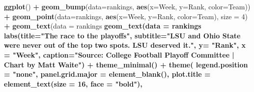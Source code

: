 \documentclass[
]{book}
\newenvironment{Shaded}{\begin{snugshade}}{\end{snugshade}}
\newcommand{\DataTypeTok}[1]{\textcolor[rgb]{0.13,0.29,0.53}{#1}}
\newcommand{\DecValTok}[1]{\textcolor[rgb]{0.00,0.00,0.81}{#1}}
\newcommand{\FloatTok}[1]{\textcolor[rgb]{0.00,0.00,0.81}{#1}}
\newcommand{\KeywordTok}[1]{\textcolor[rgb]{0.13,0.29,0.53}{\textbf{#1}}}
\newcommand{\NormalTok}[1]{#1}
\newcommand{\OperatorTok}[1]{\textcolor[rgb]{0.81,0.36,0.00}{\textbf{#1}}}
\newcommand{\StringTok}[1]{\textcolor[rgb]{0.31,0.60,0.02}{#1}}
\begin{document}
\begin{Shaded}
\begin{Highlighting}[]
\KeywordTok{ggplot}\NormalTok{() }\OperatorTok{+}\StringTok{ }
\StringTok{  }\KeywordTok{geom_bump}\NormalTok{(}\DataTypeTok{data=}\NormalTok{rankings, }\KeywordTok{aes}\NormalTok{(}\DataTypeTok{x=}\NormalTok{Week, }\DataTypeTok{y=}\NormalTok{Rank, }\DataTypeTok{color=}\NormalTok{Team)) }\OperatorTok{+}\StringTok{ }
\StringTok{  }\KeywordTok{geom_point}\NormalTok{(}\DataTypeTok{data=}\NormalTok{rankings, }\KeywordTok{aes}\NormalTok{(}\DataTypeTok{x=}\NormalTok{Week, }\DataTypeTok{y=}\NormalTok{Rank, }\DataTypeTok{color=}\NormalTok{Team), }\DataTypeTok{size =} \DecValTok{4}\NormalTok{) }\OperatorTok{+}\StringTok{   }
\StringTok{  }\KeywordTok{geom_text}\NormalTok{(}\DataTypeTok{data =}\NormalTok{ rankings }\OperatorTok{%
\StringTok{  }\KeywordTok{geom_text}\NormalTok{(}\DataTypeTok{data =}\NormalTok{ rankings }\OperatorTok{%
\StringTok{  }\KeywordTok{labs}\NormalTok{(}\DataTypeTok{title=}\StringTok{"The race to the playoffs"}\NormalTok{, }\DataTypeTok{subtitle=}\StringTok{"LSU and Ohio State were never out of the top two spots. LSU deserved it."}\NormalTok{, }\DataTypeTok{y=} \StringTok{"Rank"}\NormalTok{, }\DataTypeTok{x =} \StringTok{"Week"}\NormalTok{, }\DataTypeTok{caption=}\StringTok{"Source: College Football Playoff Committee | Chart by Matt Waite"}\NormalTok{) }\OperatorTok{+}
\StringTok{  }\KeywordTok{theme_minimal}\NormalTok{() }\OperatorTok{+}
\StringTok{  }\KeywordTok{theme}\NormalTok{(}
    \DataTypeTok{legend.position =} \StringTok{"none"}\NormalTok{,}
    \DataTypeTok{panel.grid.major =} \KeywordTok{element_blank}\NormalTok{(),}
    \DataTypeTok{plot.title =} \KeywordTok{element_text}\NormalTok{(}\DataTypeTok{size =} \DecValTok{16}\NormalTok{, }\DataTypeTok{face =} \StringTok{"bold"}\NormalTok{),}
}}
\end{Highlighting}
\end{Shaded}
\end{document}
